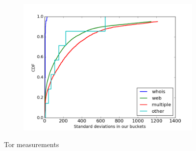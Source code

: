 \begin{figure}
\begin{subfigure}[t]{0.32\textwidth}
		\includegraphics[scale=0.3]{images/stddevs.png}
		\label{fig:stats_c}
	\end{subfigure}
	\label{fig:measurements}
	\caption{Tor measurements}
\end{figure}
